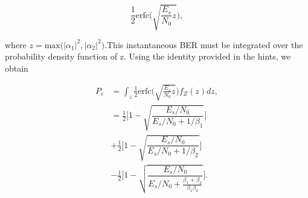 \documentclass [a4paper, 11pt] {article}
\begin{document}
\begin{solution}
\begin{enumerate}
\begin{equation}\frac{1}{2}\text{erfc}\Bigg(\sqrt{\frac{E_s}{N_0}z} \Bigg),
\end{equation}

where $z = \text{max}\big(|\alpha_1|^2,|\alpha_2|^2\big)$.This instantaneous BER must be integrated over the probability density function of z. Using the identity provided in the hints, we obtain

\begin{align}
    P_e &= \int_{z}\frac{1}{2}\text{erfc}\Bigg(\sqrt{\frac{E_s}{N_0}z}\Bigg)f_Z(z) dz,\\
    &= \frac{1}{2} \Bigg[1-\sqrt{\dfrac{E_s/N_0}{E_s/N_0+ 1/\beta_1}}\Bigg]\\
    &+ \frac{1}{2} \Bigg[1-\sqrt{\dfrac{E_s/N_0}{E_s/N_0+ 1/\beta_2}}\Bigg] \nonumber\\
    &- \frac{1}{2} \Bigg[1-\sqrt{\dfrac{E_s/N_0}{E_s/N_0+\frac{\beta_1 + \beta_2}{\beta_1\beta_2}}}\Bigg].\nonumber
\end{align}



\end{enumerate}

    \end{solution}
\end{document}
